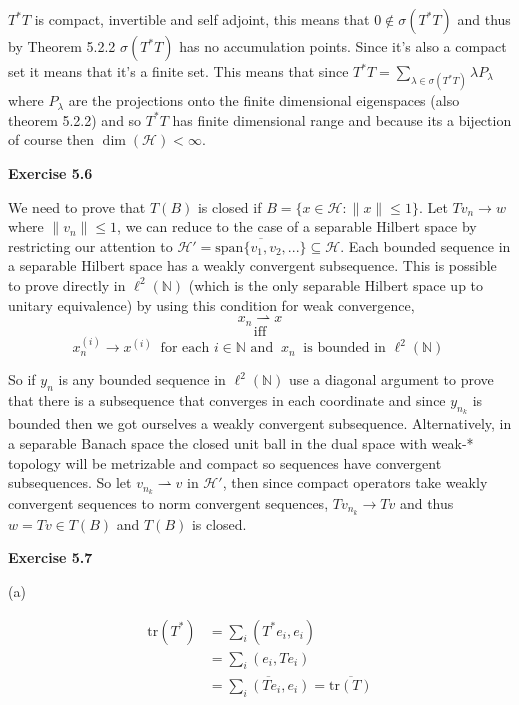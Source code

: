 \documentclass{article}
\begin{document}
$T^*T$ is compact, invertible and self adjoint, this means that $0 \not \in \sigma(T^*T)$ and thus by Theorem 5.2.2 $\sigma(T^*T)$ has no accumulation points. Since it's also a compact set it means that it's a finite set. This means that since $T^*T = \sum\limits_{\lambda \in \sigma(T^*T)} \lambda P_\lambda$ where $P_\lambda$ are the projections onto the finite dimensional eigenspaces (also theorem 5.2.2) and so $T^*T$ has finite dimensional range and because its a bijection of course then $\dim(\mathcal H) < \infty$.

\vspace{0.5cm}

\textbf{Exercise 5.6}

\vspace{0.5cm}

We need to prove that $T(B)$ is closed if $B = \{x \in \mathcal H:\|x\| \leq 1\}$. Let $Tv_n \rightarrow w$ where $\|v_n\| \leq 1$, we can reduce to the case of a separable Hilbert space by restricting our attention to $\mathcal H' = \overline{\text{span}\{v_1, v_2,...\}} \subseteq \mathcal H$. Each bounded sequence in a separable Hilbert space has a weakly convergent subsequence. This is possible to prove directly in $\ell^2(\mathbb N)$ (which is the only separable Hilbert space up to unitary equivalence) by using this condition for weak convergence, 
$$x_{n} \rightharpoonup x$$ 
$$\text{iff}$$
$$x^{(i)}_{n} \rightarrow x^{(i)} \ \text{ for each } i \in \mathbb N \text{ and } \ x_n \ \text{ is bounded in }\ell^2(\mathbb N) \ $$

So if $y_n$ is any bounded sequence in $\ell^2(\mathbb N)$ use a diagonal argument to prove that there is a subsequence that converges in each coordinate and since $y_{n_k}$ is bounded then we got ourselves a weakly convergent subsequence. Alternatively, in a separable Banach space the closed unit ball in the dual space with weak-* topology will be metrizable and compact so sequences have convergent subsequences. So let $v_{n_k} \rightharpoonup v$ in $\mathcal H'$, then since compact operators take weakly convergent sequences to norm convergent sequences, $Tv_{n_k} \rightarrow Tv$ and thus $w = Tv \in T(B)$ and $T(B)$ is closed.
\vspace{0.5cm}

\textbf{Exercise 5.7}

\vspace{0.5cm}
(a)

\begin{align*}
    \text{tr}(T^*) & =\sum_i (T^*e_i, e_i) \\
    & =\sum_i (e_i, Te_i) \\
    & = \overline{\sum_i (Te_i, e_i)} = \overline{\text{tr}(T)}
\end{align*}
\end{document}
